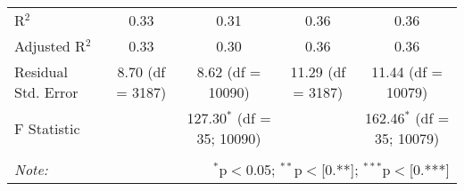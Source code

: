 \begin{table}[!htbp]
\begin{tabular}{@{\extracolsep{5pt}}lcccc}
R$^{2}$ & 0.33 & 0.31 & 0.36 & 0.36 \\ 
Adjusted R$^{2}$ & 0.33 & 0.30 & 0.36 & 0.36 \\ 
Residual Std. Error & 8.70 (df = 3187) & 8.62 (df = 10090) & 11.29 (df = 3187) & 11.44 (df = 10079) \\ 
F Statistic &  & 127.30$^{*}$ (df = 35; 10090) &  & 162.46$^{*}$ (df = 35; 10079) \\ 
\hline 
\hline \\[-1.8ex] 
\textit{Note:}  & \multicolumn{4}{r}{$^{*}$p$<$0.05; $^{**}$p$<$[0.**]; $^{***}$p$<$[0.***]} \\ 
\end{tabular} 
\end{table} 
